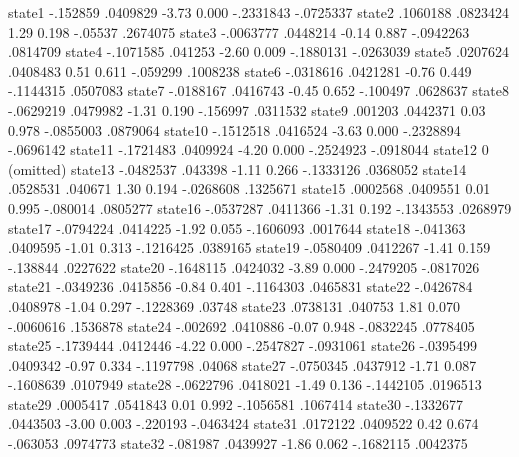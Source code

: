       state1 {\VBAR}   -.152859   .0409829    -3.73   0.000    -.2331843   -.0725337
      state2 {\VBAR}   .1060188   .0823424     1.29   0.198      -.05537    .2674075
      state3 {\VBAR}  -.0063777   .0448214    -0.14   0.887    -.0942263    .0814709
      state4 {\VBAR}  -.1071585    .041253    -2.60   0.009    -.1880131   -.0263039
      state5 {\VBAR}   .0207624   .0408483     0.51   0.611     -.059299    .1008238
      state6 {\VBAR}  -.0318616   .0421281    -0.76   0.449    -.1144315    .0507083
      state7 {\VBAR}  -.0188167   .0416743    -0.45   0.652     -.100497    .0628637
      state8 {\VBAR}  -.0629219   .0479982    -1.31   0.190     -.156997    .0311532
      state9 {\VBAR}    .001203   .0442371     0.03   0.978    -.0855003    .0879064
     state10 {\VBAR}  -.1512518   .0416524    -3.63   0.000    -.2328894   -.0696142
     state11 {\VBAR}  -.1721483   .0409924    -4.20   0.000    -.2524923   -.0918044
     state12 {\VBAR}          0  (omitted)
     state13 {\VBAR}  -.0482537    .043398    -1.11   0.266    -.1333126    .0368052
     state14 {\VBAR}   .0528531    .040671     1.30   0.194    -.0268608    .1325671
     state15 {\VBAR}   .0002568   .0409551     0.01   0.995     -.080014    .0805277
     state16 {\VBAR}  -.0537287   .0411366    -1.31   0.192    -.1343553    .0268979
     state17 {\VBAR}  -.0794224   .0414225    -1.92   0.055    -.1606093    .0017644
     state18 {\VBAR}   -.041363   .0409595    -1.01   0.313    -.1216425    .0389165
     state19 {\VBAR}  -.0580409   .0412267    -1.41   0.159     -.138844    .0227622
     state20 {\VBAR}  -.1648115   .0424032    -3.89   0.000    -.2479205   -.0817026
     state21 {\VBAR}  -.0349236   .0415856    -0.84   0.401    -.1164303    .0465831
     state22 {\VBAR}  -.0426784   .0408978    -1.04   0.297    -.1228369      .03748
     state23 {\VBAR}   .0738131    .040753     1.81   0.070    -.0060616    .1536878
     state24 {\VBAR}   -.002692   .0410886    -0.07   0.948    -.0832245    .0778405
     state25 {\VBAR}  -.1739444   .0412446    -4.22   0.000    -.2547827   -.0931061
     state26 {\VBAR}  -.0395499   .0409342    -0.97   0.334    -.1197798      .04068
     state27 {\VBAR}  -.0750345   .0437912    -1.71   0.087    -.1608639    .0107949
     state28 {\VBAR}  -.0622796   .0418021    -1.49   0.136    -.1442105    .0196513
     state29 {\VBAR}   .0005417   .0541843     0.01   0.992    -.1056581    .1067414
     state30 {\VBAR}  -.1332677   .0443503    -3.00   0.003     -.220193   -.0463424
     state31 {\VBAR}   .0172122   .0409522     0.42   0.674     -.063053    .0974773
     state32 {\VBAR}   -.081987   .0439927    -1.86   0.062    -.1682115    .0042375
